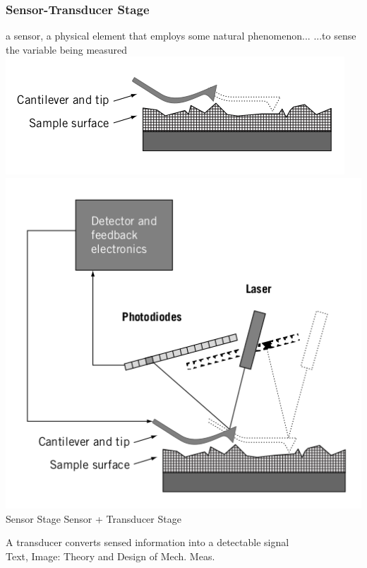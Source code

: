 \documentclass[fleqn]{beamer} %
\begin{document}
			\begin{frame}
				\frametitle{Sensor-Transducer Stage}
				a {\PR sensor}, a physical element that employs some natural phenomenon... ...to sense the variable being measured
				\includegraphics[scale=0.20]{images/sensor_stage.png}\hspace{5mm}\includegraphics[scale=0.20]{images/sensor_transducer_stage.png}\\
               	{\footnotesize \hspace{10mm} {\PR Sensor} Stage \hspace{15mm} Sensor + {\GR Transducer} Stage} \vspace{3mm}

				A {\GR transducer} converts sensed information into a detectable signal \\
				{\tiny Text, Image: Theory and Design of Mech. Meas.}
			\end{frame}
\end{document}
